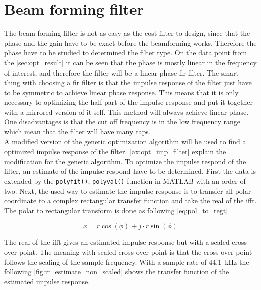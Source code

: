 \section{Beam forming filter}
The beam forming filter is not as easy as the cost filter to design, since that the phase and the gain have to be exact before the beamforming works. Therefore the phase have to be studied to determined the filter type. On the data point from the \ref{sec:opt_result} it can be seen that the phase is mostly linear in the frequency of interest, and therefore the filter will be a linear phase \gls{fir} filter. The smart thing with choosing a \gls{fir} filter is that the impulse response of the filter just have to be symmetric to achieve linear phase response. This means that it is only necessary to optimizing the half part of the impulse response and put it together with a mirrored version of it self. This method will always achieve linear phase. One disadvantages is that the cut off frequency is in the low frequency range which mean that the filter will have many taps. \\

 A modified version of the genetic optimization algorithm will be used to find a optimized impulse response of the filter. \autoref{ax:opt_imp_filter} explain the modification for the genetic algorithm. To optimize the impulse respond of the filter, an estimate of the impulse respond have to be determined. First the data is extended by the \texttt{polyfit()},  \texttt{polyval()} function in MATLAB with an order of two. Next, the used way to estimate the impulse response is to transfer all polar coordinate to a complex rectangular transfer function and take the real of the \gls{ifft}. The polar to rectangular transform is done as following \autoref{eq:pol_to_regt}

\begin{equation}\label{eq:pol_to_regt}
x=r \cos(\phi)+j \cdot r \sin(\phi)
\end{equation}


     \startexplain
    \stopexplain

The real of the \gls{ifft} gives an estimated impulse response but with a scaled cross over point. The meaning with scaled cross over point is that the cross over point follows the scaling of the sample frequency. With a sample rate of \SI{44.1}{\kilo\hertz} the following  \autoref{fig:ir_estimate_non_scaled} shows the transfer function of the estimated impulse response. 

